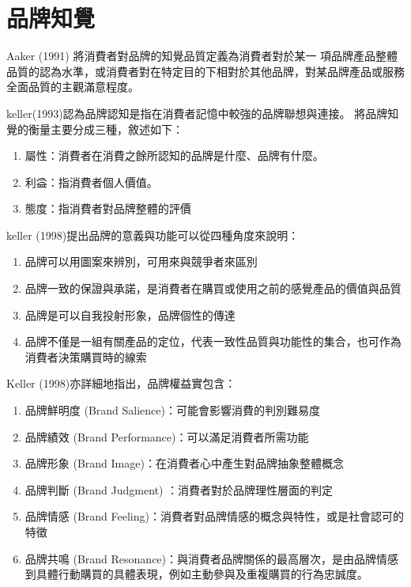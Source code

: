\section{品牌知覺}
Aaker (1991) 將消費者對品牌的知覺品質定義為消費者對於某一 項品牌產品整體品質的認為水準，或消費者對在特定目的下相對於其他品牌，對某品牌產品或服務全面品質的主觀滿意程度。\cite{Aaker1991}

keller(1993)認為品牌認知是指在消費者記憶中較強的品牌聯想與連接。
將品牌知覺的衡量主要分成三種\cite{Keller1993}，敘述如下：
\begin{enumerate}
\item 屬性：消費者在消費之餘所認知的品牌是什麼、品牌有什麼。
\item 利益：指消費者個人價值。
\item 態度：指消費者對品牌整體的評價
\end{enumerate}


keller (1998)提出品牌的意義與功能可以從四種角度來說明\cite{Keller1998}：
\begin{enumerate}
\item 品牌可以用圖案來辨別，可用來與競爭者來區別

\item 品牌一致的保證與承諾，是消費者在購買或使用之前的感覺產品的價值與品質

\item 品牌是可以自我投射形象，品牌個性的傳達

\item 品牌不僅是一組有關產品的定位，代表一致性品質與功能性的集合，也可作為消費者決策購買時的線索
\end{enumerate}

    Keller (1998)亦詳細地指出，品牌權益實包含\cite{Keller1998}：
\begin{enumerate}
\item 品牌鮮明度 (Brand Salience)：可能會影響消費的判別難易度
\item 品牌績效 (Brand Performance)：可以滿足消費者所需功能
\item 品牌形象 (Brand Image)：在消費者心中產生對品牌抽象整體概念
\item 品牌判斷 (Brand Judgment) ：消費者對於品牌理性層面的判定
\item 品牌情感 (Brand Feeling)：消費者對品牌情感的概念與特性，或是社會認可的特徵
\item 品牌共鳴 (Brand Resonance)：與消費者品牌關係的最高層次，是由品牌情感到具體行動購買的具體表現，例如主動參與及重複購買的行為忠誠度。
\end{enumerate}
  
